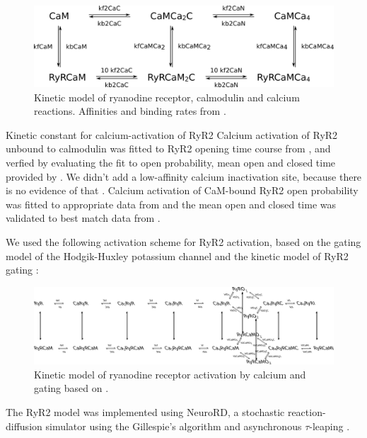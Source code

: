 \documentclass[9pt,lineno]{elife}
\begin{document}
\begin{figure}
\includegraphics[width=0.95\linewidth]{ryrcamca_binding_scheme.png}
\caption{Kinetic model of ryanodine receptor, calmodulin and calcium reactions. Affinities and binding rates from \citep{BALSHAW200120144, ryrcam_sites_affinities, ryrcam_dissociation_rate, 3_sites_ryr3cam, doi:10.1021/bi700655h, Fret_CaM_to_RyR2}. \label{fig:RyR2activation}}
\end{figure}

Kinetic constant for calcium-activation of RyR2 Calcium activation of RyR2 unbound to calmodulin was fitted to RyR2 opening time course from \citep{ca_stoichiometry_ryr}, and verfied by evaluating the fit to open probability, mean open and closed time provided by \citep{xu_meissner_2004}. We didn't add a low-affinity calcium inactivation site, because there is no evidence of that \citep{https://doi.org/10.1111/j.1469-7793.1999.00575.x}. Calcium activation of CaM-bound RyR2 open probability was fitted to appropriate data from \citep{xu_meissner_2004} and the mean open and closed time was validated to best match data from \citep{xu_meissner_2004}.

We used the following activation scheme for RyR2 activation, based on the gating model of the Hodgik-Huxley potassium channel \citep{johnston_wu} and the kinetic model of RyR2 gating \citep{Zahradnikova_kon,ca_stoichiometry_ryr}:
\begin{figure}
\includegraphics[width=0.95\linewidth]{RyR_Ca_activation_scheme.png}
\caption{Kinetic model of ryanodine receptor activation by calcium and gating based on \citep{johnston_wu,Zahradnikova_kon,ca_stoichiometry_ryr}. \label{fig:RyR2activation}}
\end{figure}




The RyR2 model was implemented using NeuroRD, a stochastic reaction-diffusion simulator using the Gillespie's algorithm and asynchronous $\tau$-leaping \citep{neurord_tau_leaping}.
\end{document}
